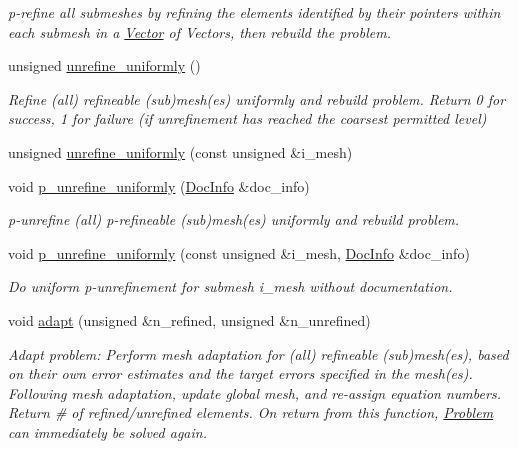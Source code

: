 \begin{DoxyCompactItemize}
\begin{DoxyCompactList}\small\item\em p-\/refine all submeshes by refining the elements identified by their pointers within each submesh in a \hyperlink{classoomph_1_1Vector}{Vector} of Vectors, then rebuild the problem. \end{DoxyCompactList}\item 
unsigned \hyperlink{classoomph_1_1Problem_a10dae99dec2f8202887f4e49e175f39c}{unrefine\+\_\+uniformly} ()
\begin{DoxyCompactList}\small\item\em Refine (all) refineable (sub)mesh(es) uniformly and rebuild problem. Return 0 for success, 1 for failure (if unrefinement has reached the coarsest permitted level) \end{DoxyCompactList}\item 
unsigned \hyperlink{classoomph_1_1Problem_aadd2996d4046e5a6176c92f4abc899d5}{unrefine\+\_\+uniformly} (const unsigned \&i\+\_\+mesh)
\item 
void \hyperlink{classoomph_1_1Problem_a21d8f0ff6813b09f35acbc7a76232397}{p\+\_\+unrefine\+\_\+uniformly} (\hyperlink{classoomph_1_1DocInfo}{Doc\+Info} \&doc\+\_\+info)
\begin{DoxyCompactList}\small\item\em p-\/unrefine (all) p-\/refineable (sub)mesh(es) uniformly and rebuild problem. \end{DoxyCompactList}\item 
void \hyperlink{classoomph_1_1Problem_a706a2845212ece5535260cca6301653d}{p\+\_\+unrefine\+\_\+uniformly} (const unsigned \&i\+\_\+mesh, \hyperlink{classoomph_1_1DocInfo}{Doc\+Info} \&doc\+\_\+info)
\begin{DoxyCompactList}\small\item\em Do uniform p-\/unrefinement for submesh i\+\_\+mesh without documentation. \end{DoxyCompactList}\item 
void \hyperlink{classoomph_1_1Problem_afc4492ec2686c70467cb0cdb4638a45f}{adapt} (unsigned \&n\+\_\+refined, unsigned \&n\+\_\+unrefined)
\begin{DoxyCompactList}\small\item\em Adapt problem\+: Perform mesh adaptation for (all) refineable (sub)mesh(es), based on their own error estimates and the target errors specified in the mesh(es). Following mesh adaptation, update global mesh, and re-\/assign equation numbers. Return \# of refined/unrefined elements. On return from this function, \hyperlink{classoomph_1_1Problem}{Problem} can immediately be solved again. \end{DoxyCompactList}\item 

\end{DoxyCompactItemize}

